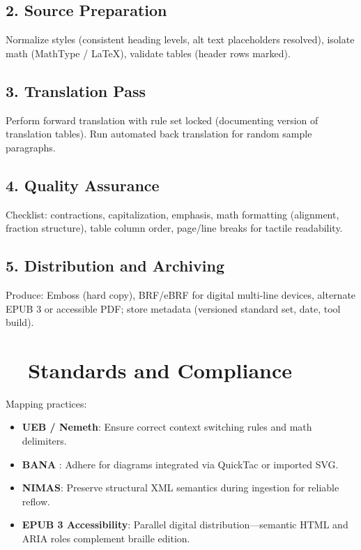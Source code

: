 \subsection*{2. Source Preparation}
Normalize styles (consistent heading levels, alt text placeholders resolved), isolate math (MathType / LaTeX), validate tables (header rows marked).

\subsection*{3. Translation Pass}
Perform forward translation with rule set locked (documenting version of translation tables). Run automated back translation for random sample paragraphs.

\subsection*{4. Quality Assurance}
Checklist: contractions, capitalization, emphasis, math formatting (alignment, fraction structure), table column order, page/line breaks for tactile readability.

\subsection*{5. Distribution and Archiving}
Produce: Emboss (hard copy), BRF/eBRF for digital multi-line devices, alternate EPUB 3 or accessible PDF; store metadata (versioned standard set, date, tool build).

\section{~~Standards and Compliance}\label{ch12:sec:standards-compliance}
Mapping practices:
\begin{itemize}
	\item \textbf{UEB / Nemeth}: Ensure correct context switching rules and math delimiters.
	\item \textbf{BANA }: Adhere for diagrams integrated via QuickTac or imported SVG.
	\item \textbf{NIMAS}: Preserve structural XML semantics during ingestion for reliable reflow\supercite{USDeptEducation2021}.
	\item \textbf{EPUB 3 Accessibility}: Parallel digital distribution—semantic HTML and ARIA roles complement braille edition\supercite{ElsevierEPUB3}.
\end{itemize}

